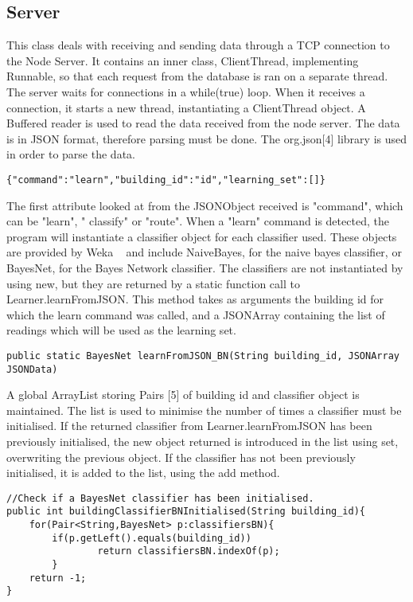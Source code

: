 \subsection{Server}
This class deals with receiving and sending data through a TCP connection to the Node Server. 
It contains an inner class, ClientThread, implementing Runnable, so that each request from the database is ran on a separate thread. The server waits for connections in a while(true) loop. When it receives a connection, it starts a new thread, instantiating a ClientThread object. A Buffered reader is used to read the data received from the node server. The data is in JSON format, therefore parsing must be done. The org.json[4] library is used in order to parse the data. 
\begin{lstlisting} 
{"command":"learn","building_id":"id","learning_set":[]}
\end{lstlisting}
The first attribute looked at from the JSONObject received is "command", which can be  "learn", " classify" or "route". 
When a "learn" command is detected, the program will instantiate a classifier object for each classifier used. These objects are provided by Weka ~\cite{Weka} and include NaiveBayes, for the naive bayes classifier, or BayesNet, for the Bayes Network classifier. 
The classifiers are not instantiated by using new, but they are returned by a static function call to Learner.learnFromJSON. This method takes as arguments the building id for which the learn command was called, and a JSONArray containing the list of readings which will be used as the learning set. 
\begin{lstlisting} 
public static BayesNet learnFromJSON_BN(String building_id, JSONArray JSONData)
\end{lstlisting}
 A global ArrayList storing Pairs [5] of building id and classifier object is maintained. The list is used to minimise the number of times a classifier must be initialised. If the returned classifier from Learner.learnFromJSON has been previously initialised, the new object returned is introduced in the list using set, overwriting the previous object. If the classifier has not been previously initialised, it is added to the list, using the add method. 
\begin{lstlisting}
//Check if a BayesNet classifier has been initialised.	
public int buildingClassifierBNInitialised(String building_id){
	for(Pair<String,BayesNet> p:classifiersBN){
		if(p.getLeft().equals(building_id))
        		return classifiersBN.indexOf(p);
        }
    return -1;
}    
\end{lstlisting}

